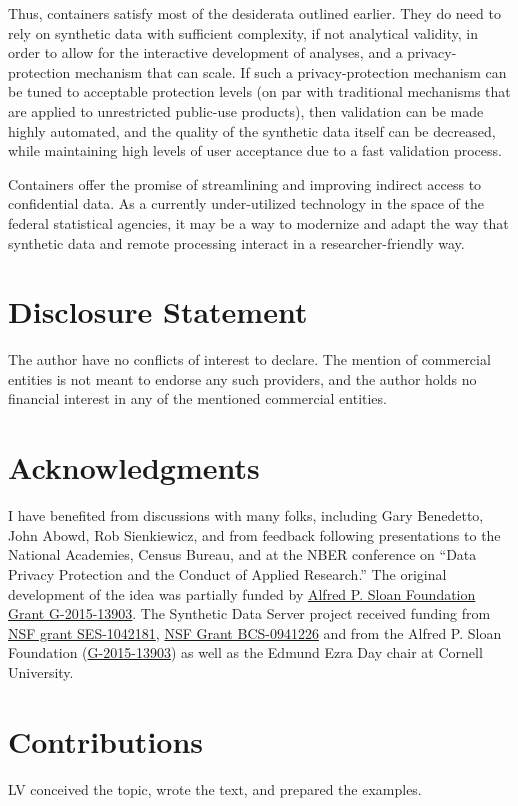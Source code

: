 \documentclass[12pt]{article}
\begin{document}
Thus, containers satisfy most of the desiderata outlined earlier. They do need to rely on synthetic data with sufficient complexity, if not analytical validity, in order to allow for the interactive development of analyses, and a privacy-protection mechanism that can scale. If such a privacy-protection mechanism can be tuned to acceptable protection levels (on par with traditional mechanisms that are applied to unrestricted public-use products), then validation can be made highly automated, and the quality of the synthetic data itself can be decreased, while maintaining high levels of user acceptance due to a fast validation process.

Containers offer the promise of streamlining and improving indirect access to confidential data. As a currently under-utilized technology in the space of the federal statistical agencies, it may be a way to modernize and adapt the way that synthetic data and remote processing interact in a researcher-friendly way.























\section*{Disclosure Statement}
The author have no conflicts of interest to declare. The mention of commercial entities is not meant to endorse any such providers, and the author holds no financial interest in any of the mentioned commercial entities.

\section*{Acknowledgments}

I have benefited from discussions with many folks, including Gary Benedetto, John Abowd, Rob Sienkiewicz, and from feedback following presentations to the National Academies, Census Bureau, and at the NBER conference on ``Data Privacy Protection and the Conduct of Applied Research.'' The original development of the idea was partially funded by \href{https://sloan.org/grant-detail/g-2015-13903}{Alfred P. Sloan Foundation Grant G-2015-13903}. The Synthetic Data Server project received funding from \href{https://www.nsf.gov/awardsearch/showAward?AWD_ID=1042181}{NSF grant SES-1042181}, \href{https://www.nsf.gov/awardsearch/showAward?AWD_ID=0941226}{NSF Grant BCS-0941226} and from the Alfred P. Sloan Foundation (\href{https://sloan.org/grant-detail/g-2015-13903}{G-2015-13903}) as well as the  Edmund Ezra Day chair at Cornell University.

\section*{Contributions}

LV conceived the topic, wrote the text, and prepared the examples.







\end{document}
